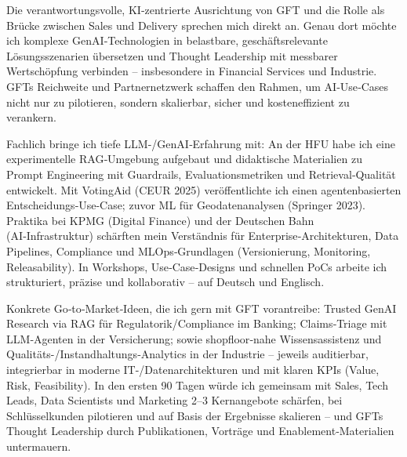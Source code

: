 Die verantwortungsvolle, KI‑zentrierte Ausrichtung von GFT und die Rolle als Brücke zwischen Sales und Delivery sprechen mich direkt an. Genau dort möchte ich komplexe GenAI‑Technologien in belastbare, geschäftsrelevante Lösungsszenarien übersetzen und Thought Leadership mit messbarer Wertschöpfung verbinden – insbesondere in Financial Services und Industrie. GFTs Reichweite und Partnernetzwerk schaffen den Rahmen, um AI‑Use‑Cases nicht nur zu pilotieren, sondern skalierbar, sicher und kosteneffizient zu verankern.

Fachlich bringe ich tiefe LLM-/GenAI‑Erfahrung mit: An der HFU habe ich eine experimentelle RAG‑Umgebung aufgebaut und didaktische Materialien zu Prompt Engineering mit Guardrails, Evaluationsmetriken und Retrieval‑Qualität entwickelt. Mit VotingAid (CEUR 2025) veröffentlichte ich einen agentenbasierten Entscheidungs‑Use‑Case; zuvor ML für Geodatenanalysen (Springer 2023). Praktika bei KPMG (Digital Finance) und der Deutschen Bahn (AI‑Infrastruktur) schärften mein Verständnis für Enterprise‑Architekturen, Data Pipelines, Compliance und MLOps‑Grundlagen (Versionierung, Monitoring, Releasability). In Workshops, Use‑Case‑Designs und schnellen PoCs arbeite ich strukturiert, präzise und kollaborativ – auf Deutsch und Englisch.

Konkrete Go‑to‑Market‑Ideen, die ich gern mit GFT vorantreibe: Trusted GenAI Research via RAG für Regulatorik/Compliance im Banking; Claims‑Triage mit LLM‑Agenten in der Versicherung; sowie shopfloor‑nahe Wissensassistenz und Qualitäts-/Instandhaltungs‑Analytics in der Industrie – jeweils auditierbar, integrierbar in moderne IT-/Datenarchitekturen und mit klaren KPIs (Value, Risk, Feasibility). In den ersten 90 Tagen würde ich gemeinsam mit Sales, Tech Leads, Data Scientists und Marketing 2–3 Kernangebote schärfen, bei Schlüsselkunden pilotieren und auf Basis der Ergebnisse skalieren – und GFTs Thought Leadership durch Publikationen, Vorträge und Enablement‑Materialien untermauern.